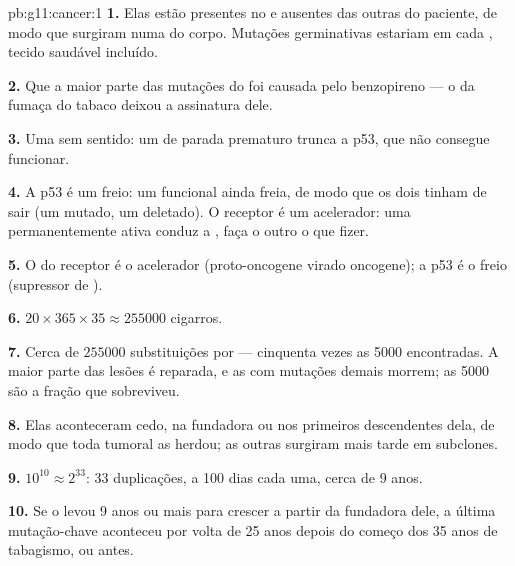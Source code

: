 \begin{solution}{pb:g11:cancer:1}
\textbf{1.} Elas estão presentes no  e ausentes das outras 
do paciente, de modo que surgiram numa  do corpo. Mutações
germinativas estariam em cada , tecido saudável incluído.

\textbf{2.} Que a maior parte das mutações do  foi causada pelo
benzopireno --- o  da fumaça do tabaco deixou a assinatura dele.

\textbf{3.} Uma  sem sentido: um  de parada prematuro
trunca a p53, que não consegue funcionar.

\textbf{4.} A p53 é um freio: um  funcional ainda freia, de modo
que os dois tinham de sair (um mutado, um deletado). O receptor é um
acelerador: uma  permanentemente ativa conduz a , faça o
outro  o que fizer.

\textbf{5.} O  do receptor é o acelerador (proto-oncogene virado
oncogene); a p53 é o freio (supressor de ).

\textbf{6.} $20 \times 365 \times 35 \approx \num{255000}$ cigarros.

\textbf{7.} Cerca de $\num{255000}$ substituições por  ---
cinquenta vezes as 5000 encontradas. A maior parte das lesões é
reparada, e as  com mutações demais morrem; as 5000 são a fração
que sobreviveu.

\textbf{8.} Elas aconteceram cedo, na  fundadora ou nos primeiros
descendentes dela, de modo que toda  tumoral as herdou; as outras
surgiram mais tarde em subclones.

\textbf{9.} $10^{10} \approx 2^{33}$: 33 duplicações, a 100 dias cada
uma, cerca de 9 anos.

\textbf{10.} Se o  levou 9 anos ou mais para crescer a partir da
 fundadora dele, a última mutação-chave aconteceu por volta de 25
anos depois do começo dos 35 anos de tabagismo, ou antes.


\end{solution}
